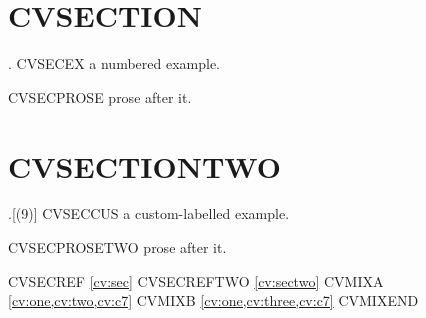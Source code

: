 \section{CVSECTION}
\ex.\label{cv:three} CVSECEX a numbered example.

CVSECPROSE prose after it.\label{cv:sec}

\section{CVSECTIONTWO}
\ex.[(9)] CVSECCUS a custom-labelled example.

CVSECPROSETWO prose after it.\label{cv:sectwo}

CVSECREF \cref{cv:sec} CVSECREFTWO \cref{cv:sectwo} CVMIXA
\cref{cv:one,cv:two,cv:c7} CVMIXB \cref{cv:one,cv:three,cv:c7} CVMIXEND

